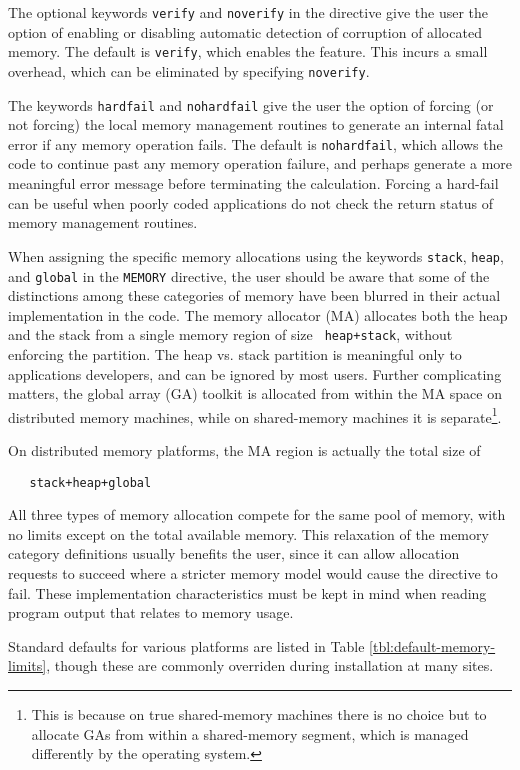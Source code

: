 The optional keywords \verb+verify+ and \verb+noverify+ in the
directive give the user the option of enabling or disabling automatic
detection of corruption of allocated memory.  The default is
\verb+verify+, which enables the feature. This incurs a small
overhead, which can be eliminated by specifying \verb+noverify+.

The keywords \verb+hardfail+ and \verb+nohardfail+ give the user the
option of forcing (or not forcing) the local memory management
routines to generate an internal fatal error if any memory operation
fails.  The default is \verb+nohardfail+, which allows the code to
continue past any memory operation failure, and perhaps generate a
more meaningful error message before terminating the calculation.
Forcing a hard-fail can be useful when poorly coded applications do
not check the return status of memory management routines.

When assigning the specific memory allocations using the keywords
\verb+stack+, \verb+heap+, and \verb+global+ in the \verb+MEMORY+
directive, the user should be aware that some of the distinctions
among these categories of memory have been blurred in their actual
implementation in the code.  The memory allocator (MA) allocates both
the heap and the stack from a single memory region of size {\tt
  heap+stack}, without enforcing the partition.  The heap vs. stack
partition is meaningful only to applications developers, and can be
ignored by most users.  Further complicating matters, the global array
(GA) toolkit is allocated from within the MA space on distributed
memory machines, while on shared-memory machines it is
separate\footnote{This is because on true shared-memory machines there
  is no choice but to allocate GAs from within a shared-memory
  segment, which is managed differently by the operating system.}.

On distributed memory platforms, the MA region is actually the total
size of 
\begin{verbatim}
   stack+heap+global
\end{verbatim}
All three types of memory allocation
compete for the same pool of memory, with no limits except on the
total available memory.  This relaxation of the memory category
definitions usually benefits the user, since it can allow allocation
requests to succeed where a stricter memory model would cause the
directive to fail.  These implementation characteristics must be kept
in mind when reading program output that relates to memory usage.

Standard defaults for various platforms are listed in Table
\ref{tbl:default-memory-limits}, though these are commonly 
overriden during installation at many sites.


